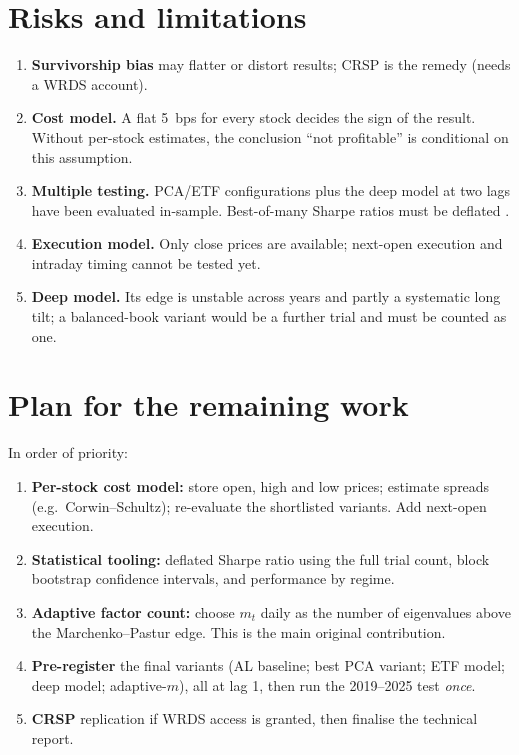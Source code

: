 \documentclass[11pt,a4paper]{article}
\begin{document}
\section{Risks and limitations}
\label{sec:risks}

\begin{enumerate}
  \item \textbf{Survivorship bias} may flatter or distort results; CRSP is the remedy (needs a
        WRDS account).
  \item \textbf{Cost model.} A flat 5~bps for every stock decides the sign of the result. Without
        per-stock estimates, the conclusion ``not profitable'' is conditional on this
        assumption.
  \item \textbf{Multiple testing.} \MPNVariants{} PCA/ETF configurations plus the deep model at two
        lags have been evaluated in-sample. Best-of-many Sharpe ratios must be deflated
        \citep{bailey2014}.
  \item \textbf{Execution model.} Only close prices are available; next-open execution and
        intraday timing cannot be tested yet.
  \item \textbf{Deep model.} Its edge is unstable across years and partly a systematic long
        tilt; a balanced-book variant would be a further trial and must be counted as one.
\end{enumerate}

\section{Plan for the remaining work}
\label{sec:plan}

In order of priority:
\begin{enumerate}
  \item \textbf{Per-stock cost model:} store open, high and low prices; estimate spreads
        (e.g.\ Corwin--Schultz); re-evaluate the shortlisted variants. Add next-open execution.
  \item \textbf{Statistical tooling:} deflated Sharpe ratio using the full trial count, block
        bootstrap confidence intervals, and performance by regime.
  \item \textbf{Adaptive factor count:} choose $m_t$ daily as the number of eigenvalues above the
        Marchenko--Pastur edge. This is the main original contribution.
  \item \textbf{Pre-register} the final variants (AL baseline; best PCA variant; ETF model; deep
        model; adaptive-$m$), all at lag 1, then run the 2019--2025 test \emph{once}.
  \item \textbf{CRSP} replication if WRDS access is granted, then finalise the technical report.
\end{enumerate}
\end{document}

